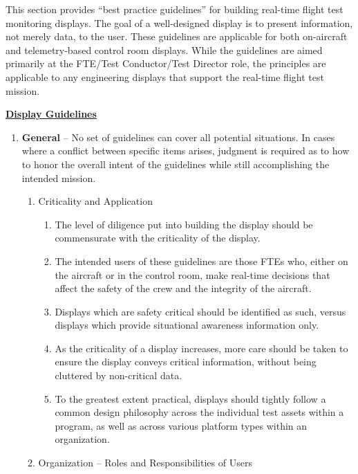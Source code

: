 \documentclass[
]{book}
\providecommand{\tightlist}{%
  \setlength{\itemsep}{0pt}\setlength{\parskip}{0pt}}
\begin{document}
This section provides ``best practice guidelines'' for building real-time flight test monitoring displays. The goal of a well-designed display is to present information, not merely data, to the user. These guidelines are applicable for both on-aircraft and telemetry-based control room displays. While the guidelines are aimed primarily at the FTE/Test Conductor/Test Director role, the principles are applicable to any engineering displays that support the real-time flight test mission.

\textbf{\underline{Display Guidelines}}

\begin{enumerate}
\def\labelenumi{\arabic{enumi}.}
\tightlist
\item
  \textbf{General} -- No set of guidelines can cover all potential situations. In cases where a conflict between specific items arises, judgment is required as to how to honor the overall intent of the guidelines while still accomplishing the intended mission.

  \begin{enumerate}
  \def\labelenumii{\alph{enumii}.}
  \tightlist
  \item
    Criticality and Application

    \begin{enumerate}
    \def\labelenumiii{\arabic{enumiii}.}
    \tightlist
    \item
      The level of diligence put into building the display should be commensurate with the criticality of the display.
    \item
      The intended users of these guidelines are those FTEs who, either on the aircraft or in the control room, make real-time decisions that affect the safety of the crew and the integrity of the aircraft.
    \item
      Displays which are safety critical should be identified as such, versus displays which provide situational awareness information only.
    \item
      As the criticality of a display increases, more care should be taken to ensure the display conveys critical information, without being cluttered by non-critical data.
    \item
      To the greatest extent practical, displays should tightly follow a common design philosophy across the individual test assets within a program, as well as across various platform types within an organization.
    \end{enumerate}
  \item
    Organization -- Roles and Responsibilities of Users


\end{enumerate}
\end{enumerate}
\end{document}
